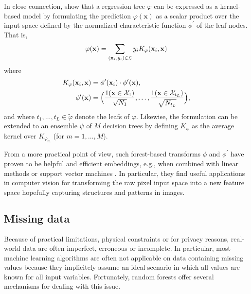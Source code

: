 In close connection, \citep{geurts:2006} show that a regression tree
$\varphi$ can be expressed as a kernel-based model by formulating the
prediction $\varphi(\mathbf{x})$ as a scalar product over the input space
defined by the normalized characteristic function $\phi^\prime$ of the leaf nodes. That is,
\begin{equation}
\varphi(\mathbf{x}) = \sum_{(\mathbf{x}_i, y_i) \in {\cal L}} y_i K_\varphi(\mathbf{x}_i, \mathbf{x})
\end{equation}
where
\begin{align}
K_\varphi(\mathbf{x}_i, \mathbf{x}) &= \phi^\prime(\mathbf{x}_i) \cdot \phi^\prime(\mathbf{x}), \\
\phi^\prime(\mathbf{x}) &= \Big( \frac{1(\mathbf{x} \in {\cal X}_1)}{\sqrt{N_1}}, \dots, \frac{1(\mathbf{x} \in {\cal X}_{t_L})}{\sqrt{N_{t_L}}}  \Big),
\end{align}
and where $t_1,\dots,t_L \in \widetilde{\varphi}$ denote the leafs of $\varphi$.
Likewise, the formulation can be extended to an ensemble $\psi$ of $M$ decision
trees by defining $K_\psi$ as the average kernel over $K_{\varphi_m}$ (for $m=1,\dots,M$).

From a more practical point of view, such forest-based transforms $\phi$ and
$\phi^\prime$ have proven to be helpful and efficient embeddings, e.g., when
combined with linear methods or support vector machines
\citep{moosmann:2006,maree:2013}. In particular, they find useful applications
in computer vision for transforming the raw pixel input space into a new
feature space hopefully capturing structures and patterns in images.

\subsection{Missing data}

Because of practical limitations, physical constraints or for privacy reasons,
real-world data are often imperfect, erroneous or incomplete. In particular,
most machine learning algorithms are often not applicable on data containing
missing values because they implicitely assume an ideal scenario in which all
values are known for all input variables. Fortunately, random forests offer
several mechanisms for dealing with this issue.


